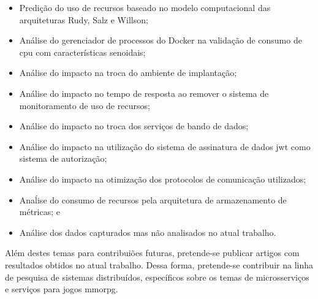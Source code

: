 \begin{itemize}
 \item Predição do uso de recursos baseado no modelo computacional das arquiteturas Rudy, Salz e Willson;
 \item Análise do gerenciador de processos do Docker na validação de consumo de \ac{cpu} com características senoidais;
 \item Análise do impacto na troca do ambiente de implantação;
 \item Análise do impacto no tempo de resposta ao remover o sistema de monitoramento de uso de recursos;
 \item Análise do impacto no troca dos serviços de bando de dados;
 \item Análise do impacto na utilização do sistema de assinatura de dados \ac{jwt} como sistema de autorização;
 \item Análise do impacto na otimização dos protocolos de comunicação utilizados;
 \item Anaĺise do consumo de recursos pela arquitetura de armazenamento de métricas; e
 \item Análise dos dados capturados mas não analisados no atual trabalho.
\end{itemize}

Além destes temas para contribuiões futuras, pretende-se publicar artigos com resultados obtidos no atual trabalho.
%
Dessa forma, pretende-se contribuir na linha de pesquisa de sistemas distribuídos, específicos sobre os temas de microsserviços e serviços para jogos \ac{mmorpg}.
